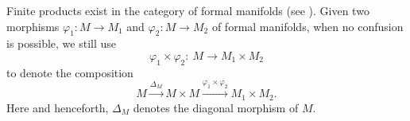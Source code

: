 \documentclass[12pt, a4paper]{amsart}
\newcommand{\BC}{{\mathbb {C}}}
\newcommand{\CL}{{\mathcal {L}}}
\newcommand{\CO}{{\mathcal {O}}}
\newcommand{\RD}{{\mathrm {D}}}
\newcommand{\RT}{{\mathrm {T}}}
\newcommand{\Ev}{\operatorname{Ev}}
\newcommand{\m}{\mathfrak m}
\newcommand{\C}{\mathbb{C}}
\newcommand{\be}{\begin {equation}}
\newcommand{\ee}{\end {equation}}
\newcommand{\qaq}{\quad\textrm{and}\quad}
\theoremstyle{Theorem}
\theoremstyle{Theorem}
\theoremstyle{Theorem}
\theoremstyle{Theorem}
\theoremstyle{Plain}
\theoremstyle{remark}
\theoremstyle{remark}
\theoremstyle{Definition}
\numberwithin{equation}{section}
\begin{document}







Finite products exist in the category of formal manifolds (see \cite[Theorem 1.9]{CSW1}).
Given two morphisms $\varphi_1: M\rightarrow M_1$ and $\varphi_2: M\rightarrow M_2$ of formal manifolds, when no confusion is possible, we still use  
   \be\label{eq:varphi1times2} \varphi_1\times \varphi_2:\ M\rightarrow M_1\times M_2\ee to denote the composition
   \[
   M\xrightarrow{\Delta_{M}}M\times M\xrightarrow{\varphi_1\times\varphi_2}M_1\times M_2. \]
   Here and henceforth, $\Delta_M$ denotes the diagonal morphism of $M$. 


\end{document}
